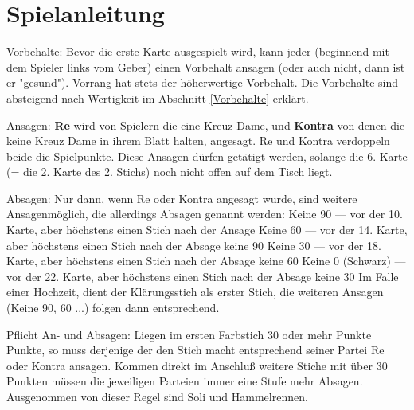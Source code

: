 \documentclass[a4paper,11pt]{article}
\begin{document}
\section{Spielanleitung}
\begin{description}
\item{Vorbehalte:}  Bevor die erste Karte ausgespielt wird, kann jeder (beginnend mit dem Spieler links vom Geber) einen Vorbehalt ansagen (oder auch nicht, dann ist er "gesund").
Vorrang hat stets der höherwertige Vorbehalt. Die Vorbehalte sind absteigend nach Wertigkeit im Abschnitt \ref{Vorbehalte} erklärt.
\item{Ansagen:} {\bf Re} wird von Spielern die eine Kreuz Dame, und {\bf Kontra} von denen die keine Kreuz Dame in ihrem Blatt halten, angesagt. Re und Kontra verdoppeln beide die Spielpunkte. Diese Ansagen dürfen getätigt werden, solange die 6. Karte (= die 2. Karte des 2. Stichs) noch nicht offen auf dem Tisch liegt. 
\item{Absagen:} Nur dann, wenn Re oder Kontra angesagt wurde, sind weitere \glqq Ansagen\grqq\;möglich, die allerdings Absagen genannt werden:
Keine 90 — vor der 10. Karte, aber höchstens einen Stich nach der Ansage
Keine 60 — vor der 14. Karte, aber höchstens einen Stich nach der Absage keine 90
Keine 30 — vor der 18. Karte, aber höchstens einen Stich nach der Absage keine 60
Keine 0 (Schwarz) — vor der 22. Karte, aber höchstens einen Stich nach der Absage keine 30
Im Falle einer Hochzeit, dient der Klärungsstich als erster Stich, die weiteren Ansagen (Keine 90, 60 ...) folgen dann entsprechend.
\item{Pflicht An- und Absagen:} Liegen im ersten Farbstich 30 oder mehr Punkte Punkte, so muss derjenige der den Stich macht entsprechend seiner Partei Re oder Kontra ansagen. Kommen direkt im Anschluß weitere Stiche mit über 30 Punkten müssen die jeweiligen Parteien immer eine Stufe mehr Absagen.
Ausgenommen von dieser Regel sind Soli und Hammelrennen.
\end{description}
\end{document}
